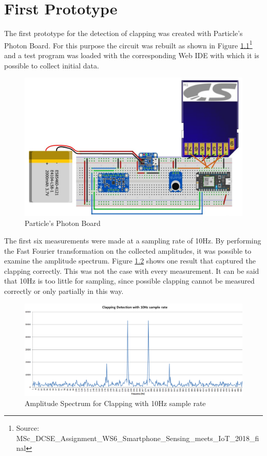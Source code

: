 \chapter{First Prototype}
The first prototype for the detection of clapping was created with Particle's Photon Board. For this purpose the circuit was rebuilt as shown in Figure \ref{fig:photonBoard}\footnote{Source: MSc\_DCSE\_Assignment\_WS6\_Smartphone\_Sensing\_meets\_IoT\_2018\_final} and a test program was loaded with the corresponding Web IDE with which it is possible to collect initial data.
\begin{figure}[h]
	\centering
	\includegraphics[width=.7\textwidth]{imgs/particleBoard}
	\caption{Particle's Photon Board}
	\label{fig:photonBoard}
\end{figure}
\newpage
The first six measurements were made at a sampling rate of 10Hz. By performing the Fast Fourier transformation on the collected amplitudes, it was possible to examine the amplitude spectrum. Figure \ref{fig:clapping10Hz} shows one result that captured the clapping correctly. This was not the case with every measurement. It can be said that 10Hz is too little for sampling, since possible clapping cannot be measured correctly or only partially in this way. 
\begin{figure}[h]
	\centering
	\includegraphics[width=\textwidth]{imgs/clapping10Hz}
	\caption{Amplitude Spectrum for Clapping with 10Hz sample rate}
	\label{fig:clapping10Hz}
\end{figure}
